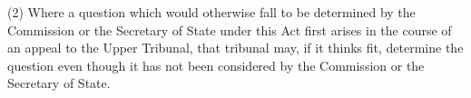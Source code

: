 \documentclass[12pt,a4paper]{article}
\begin{document}
%
%
%
%
%

(2) Where a question which would otherwise fall to be determined by the Commission or the Secretary of State under this Act first arises in the course of an appeal to the Upper Tribunal, that tribunal may, if it thinks fit, determine the question even though it has not been considered by the Commission or the Secretary of State.
\end{document}
